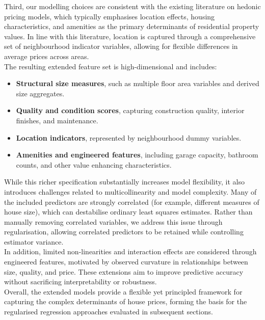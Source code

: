 \documentclass[12pt,oneside]{article} %
\begin{document}
\noindent
Third, our modelling choices are consistent with the existing literature on hedonic pricing models, which typically emphasises location effects, housing characteristics, and amenities as the primary determinants of residential property values. In line with this literature, location is captured through a comprehensive set of neighbourhood indicator variables, allowing for flexible differences in average prices across areas.\\

\noindent
The resulting extended feature set is high-dimensional and includes:
\begin{itemize}
    \item \textbf{Structural size measures}, such as multiple floor area variables and derived size aggregates.
    \item \textbf{Quality and condition scores}, capturing construction quality, interior finishes, and maintenance.
    \item \textbf{Location indicators}, represented by neighbourhood dummy variables.
    \item \textbf{Amenities and engineered features}, including garage capacity, bathroom counts, and other value enhancing characteristics.
\end{itemize}

\noindent
While this richer specification substantially increases model flexibility, it also introduces challenges related to multicollinearity and model complexity. Many of the included predictors are strongly correlated (for example, different measures of house size), which can destabilise ordinary least squares estimates. Rather than manually removing correlated variables, we address this issue through regularisation, allowing correlated predictors to be retained while controlling estimator variance.\\

\noindent
In addition, limited non-linearities and interaction effects are considered through engineered features, motivated by observed curvature in relationships between size, quality, and price. These extensions aim to improve predictive accuracy without sacrificing interpretability or robustness.\\

\noindent
Overall, the extended models provide a flexible yet principled framework for capturing the complex determinants of house prices, forming the basis for the regularised regression approaches evaluated in subsequent sections.
\end{document}
